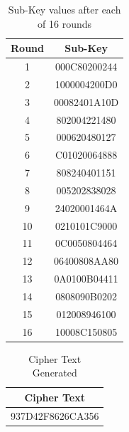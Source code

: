 \documentclass[12pt, letterpaper]{article}
\begin{document}
\begin{table}[h]
    \centering
    \begin{tabular}{|c|c|}
        \hline
        \textbf{Round} & \textbf{Sub-Key} \\
        \hline
        1 & 000C80200244
 \\
        \hline
        2 & 1000004200D0
 \\
        \hline
        3 & 00082401A10D                                                                  
 \\
        \hline
        4 & 802004221480
 \\
        \hline
        5 & 000620480127
 \\
        \hline 
        6 & C01020064888
 \\
        \hline
        7 & 808240401151
 \\
        \hline
        8 & 005202838028
 \\
        \hline
        9 & 24020001464A
 \\
        \hline
        10 & 0210101C9000
 \\
        \hline
        11 & 0C0050804464
 \\
        \hline
        12 & 06400808AA80 \\
        \hline
        13 & 0A0100B04411 \\
        \hline
        14 & 0808090B0202
 \\
        \hline
        15 & 012008946100 \\
        \hline
        16 & 10008C150805 \\
        \hline

    \end{tabular}
    \caption{Sub-Key values after each of 16 rounds}
    \label{tab:student-info}
\end{table}



\begin{table}[h]
    \centering
    \begin{tabular}{|c|}
        \hline
          Cipher Text \\
        \hline
           937D42F8626CA356
  \\
        \hline
    \end{tabular}
    \caption{Cipher Text Generated}
    \label{tab:text-key}
\end{table}

\clearpage
\end{document}
